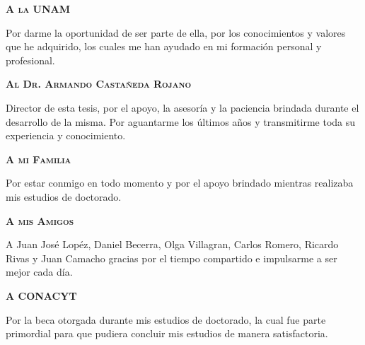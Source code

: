 {


\begin{agradecimientos}
  \textbf{\textsc{A la UNAM}}

  \vspace{1em}

  Por darme la oportunidad de ser parte de ella, por los conocimientos
  y valores que he adquirido, los cuales me han ayudado en mi
  formación personal y profesional.

  \vspace{1em}

  \textbf{\textsc{Al Dr. Armando Castañeda Rojano}}

  \vspace{1em}

  Director de esta tesis, por el apoyo, la asesoría y la paciencia
  brindada durante el desarrollo de la misma. Por aguantarme los
  últimos años y transmitirme toda su experiencia y conocimiento.

  \vspace{1em}

  \textbf{\textsc{A mi Familia}}

  \vspace{1em}

  Por estar conmigo en todo momento y por el apoyo brindado mientras
  realizaba mis estudios de doctorado.

  \vspace{1em}

  \textbf{\textsc{A mis Amigos}}

  \vspace{1em}

  A Juan José Lopéz, Daniel Becerra, Olga Villagran, Carlos Romero,
  Ricardo Rivas y Juan Camacho gracias por el tiempo compartido e
  impulsarme a ser mejor cada día.

  \vspace{1em}

  \textbf{\textsc{A CONACYT}}

  \vspace{1em}

  Por la beca otorgada durante mis estudios de doctorado, la cual fue
  parte primordial para que pudiera concluir mis estudios de manera
  satisfactoria.

\end{agradecimientos}
}
